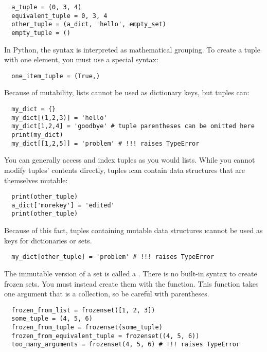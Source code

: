 \documentclass[letterpaper, 12pt, titlepage, twoside]{article}
\begin{document}
\begin{lstlisting}
  a_tuple = (0, 3, 4)
  equivalent_tuple = 0, 3, 4
  other_tuple = (a_dict, 'hello', empty_set)
  empty_tuple = ()
\end{lstlisting}

In Python, the syntax  is interpreted as mathematical grouping. To
create a tuple with one element, you must use a special syntax:

\begin{lstlisting}
  one_item_tuple = (True,)
\end{lstlisting}

Because of mutability, lists cannot be used as dictionary keys, but tuples can:

\begin{lstlisting}
  my_dict = {}
  my_dict[(1,2,3)] = 'hello'
  my_dict[1,2,4] = 'goodbye' # tuple parentheses can be omitted here
  print(my_dict)
  my_dict[[1,2,5]] = 'problem' # !!! raises TypeError
\end{lstlisting}

You can generally access and index tuples as you would lists. While you cannot
modify tuples' contents directly, tuples \i{can} contain data structures that
are themselves mutable:

\begin{lstlisting}
  print(other_tuple)
  a_dict['morekey'] = 'edited'
  print(other_tuple)
\end{lstlisting}

Because of this fact, tuples containing mutable data structures
\i{cannot} be used as keys for dictionaries or sets.

\begin{lstlisting}
  my_dict[other_tuple] = 'problem' # !!! raises TypeError
\end{lstlisting}

The immutable version of a set is called a . There is no
built-in syntax to create frozen sets. You must instead create them with the
 function. This function takes one argument that is a
collection, so be careful with parentheses.

\begin{lstlisting}
  frozen_from_list = frozenset([1, 2, 3])
  some_tuple = (4, 5, 6)
  frozen_from_tuple = frozenset(some_tuple)
  frozen_from_equivalent_tuple = frozenset((4, 5, 6))
  too_many_arguments = frozenset(4, 5, 6) # !!! raises TypeError
\end{lstlisting}
\end{document}

